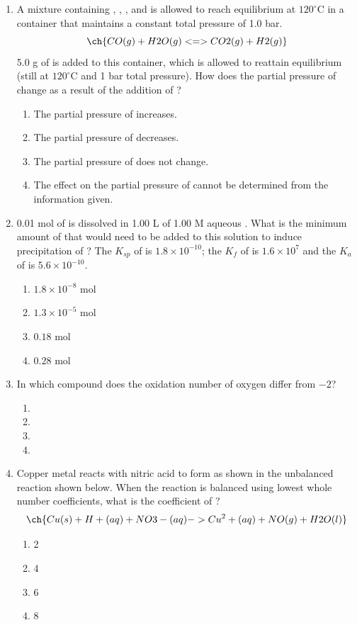 \documentclass[twocolumn, 10pt]{article}
\begin{document}
\begin{enumerate}
    \item A mixture containing , , , and  is allowed to reach equilibrium at $120^\circ\text{C}$ in a container that maintains a constant total pressure of 1.0 bar.
    \[ \ch{CO(g) + H2O(g) <=> CO2(g) + H2(g)} \]
    5.0 g of  is added to this container, which is allowed to reattain equilibrium (still at $120^\circ\text{C}$ and 1 bar total pressure). How does the partial pressure of  change as a result of the addition of ?
    \begin{enumerate}
        \item The partial pressure of  increases.
        \item The partial pressure of  decreases.
        \item The partial pressure of  does not change.
        \item The effect on the partial pressure of  cannot be determined from the information given.
    \end{enumerate}

    \item 0.01 mol of  is dissolved in 1.00 L of 1.00 M aqueous . What is the minimum amount of  that would need to be added to this solution to induce precipitation of ? The $K_{sp}$ of  is $1.8 \times 10^{-10}$; the $K_f$ of  is $1.6 \times 10^7$ and the $K_a$ of  is $5.6 \times 10^{-10}$.
    \begin{enumerate}
        \item $1.8 \times 10^{-8} \text{ mol}$
        \item $1.3 \times 10^{-5} \text{ mol}$
        \item $0.18 \text{ mol}$
        \item $0.28 \text{ mol}$
    \end{enumerate}

    \item In which compound does the oxidation number of oxygen differ from $-2$?
    \begin{enumerate}
        \item {}
        \item {}
        \item {}
        \item {}
    \end{enumerate}

    \item Copper metal reacts with nitric acid to form  as shown in the unbalanced reaction shown below. When the reaction is balanced using lowest whole number coefficients, what is the coefficient of ?
    \[ \ch{Cu(s) + H+(aq) + NO3-(aq) -> Cu^2+(aq) + NO(g) + H2O(l)} \]
    \begin{enumerate}
        \item 2
        \item 4
        \item 6
        \item 8
    \end{enumerate}


\end{enumerate}
\end{document}
